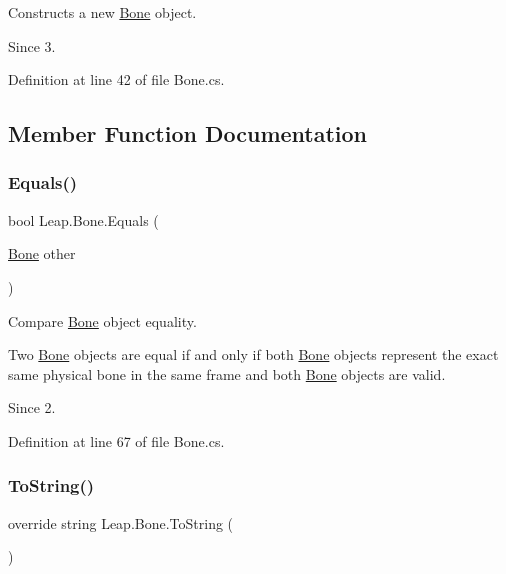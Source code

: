 Constructs a new \mbox{\hyperlink{class_leap_1_1_bone}{Bone}} object. 

\begin{DoxySince}{Since}
3. 
\end{DoxySince}


Definition at line 42 of file Bone.\+cs.



\subsection{Member Function Documentation}
\mbox{\label{class_leap_1_1_bone_a12466a8894f026da28e3ff013f305e0d}} 
\subsubsection{\texorpdfstring{Equals()}{Equals()}}
{\footnotesize\ttfamily bool Leap.\+Bone.\+Equals (\begin{DoxyParamCaption}\item[{\mbox{\hyperlink{class_leap_1_1_bone}{Bone}}}]{other }\end{DoxyParamCaption})}



Compare \mbox{\hyperlink{class_leap_1_1_bone}{Bone}} object equality. 

Two \mbox{\hyperlink{class_leap_1_1_bone}{Bone}} objects are equal if and only if both \mbox{\hyperlink{class_leap_1_1_bone}{Bone}} objects represent the exact same physical bone in the same frame and both \mbox{\hyperlink{class_leap_1_1_bone}{Bone}} objects are valid. \begin{DoxySince}{Since}
2. 
\end{DoxySince}


Definition at line 67 of file Bone.\+cs.

\mbox{\label{class_leap_1_1_bone_a989b912919381795458a53dcb01dae74}} 
\subsubsection{\texorpdfstring{ToString()}{ToString()}}
{\footnotesize\ttfamily override string Leap.\+Bone.\+To\+String (\begin{DoxyParamCaption}{ }\end{DoxyParamCaption})}



